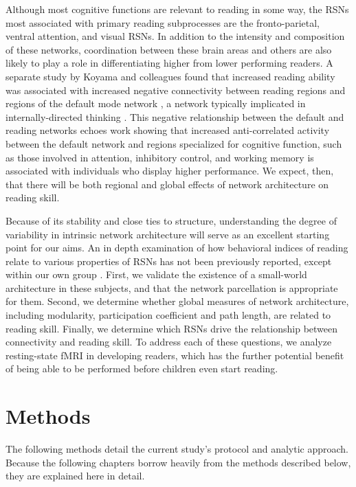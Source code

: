 Although most cognitive functions are relevant to reading in some way, the RSNs most associated with primary reading subprocesses are the fronto-parietal, ventral attention, and visual RSNs. In addition to the intensity and composition of these networks, coordination between these brain areas and others are also likely to play a role in differentiating higher from lower performing readers. A separate study by Koyama and colleagues found that increased reading ability was associated with increased negative connectivity between reading regions and regions of the default mode network \citep{Koyama2013}, a network typically implicated in internally-directed thinking \citep{Andrews-Hanna2014}. This negative relationship between the default and reading networks echoes work showing that increased anti-correlated activity between the default network and regions specialized for cognitive function, such as those involved in attention, inhibitory control, and working memory is associated with individuals who display higher performance. We expect, then, that there will be both regional and global effects of network architecture on reading skill.

Because of its stability and close ties to structure, understanding the degree of variability in intrinsic network architecture will serve as an excellent starting point for our aims. An in depth examination of how behavioral indices of reading relate to various properties of RSNs has not been previously reported, except within our own group \citep{Bailey2018}. First, we validate the existence of a small-world architecture in these subjects, and that the network parcellation is appropriate for them. Second, we determine whether global measures of network architecture, including modularity, participation coefficient and path length, are related to reading skill. Finally, we determine which RSNs drive the relationship between connectivity and reading skill. To address each of these questions, we analyze resting-state fMRI in developing readers, which has the further potential benefit of being able to be performed before children even start reading.


\section{Methods}

The following methods detail the current study's protocol and analytic approach. Because the following chapters borrow heavily from the methods described below, they are explained here in detail. 

